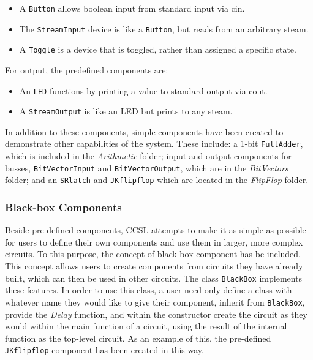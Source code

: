 \documentclass{article}
\newcommand{\Italics}[1]{\textit{#1}}
\newcommand{\ClassName}[1]{\texttt{#1}}
\newcommand{\FunctionName}[1]{\textit{#1}}
\begin{document}
\begin{itemize}

\item A \ClassName{Button} allows boolean input from standard input via cin.

\item The \ClassName{StreamInput} device is like a \ClassName{Button}, but reads from an arbitrary steam.

\item A \ClassName{Toggle} is a device that is toggled, rather than assigned a specific state.

\end{itemize}

For output, the predefined components are:

\begin{itemize}

\item An \ClassName{LED} functions by printing a value to standard output via cout.

\item A \ClassName{StreamOutput} is like an LED but prints to any steam.

\end{itemize}

In addition to these components, simple components have been created to demonstrate other capabilities of the system. These include: a 1-bit \ClassName{FullAdder}, which is included in the \Italics{Arithmetic} folder; input and output components for busses, \ClassName{BitVectorInput} and \ClassName{BitVectorOutput}, which are in the \Italics{BitVectors} folder; and an \ClassName{SRlatch} and \ClassName{JKflipflop} which are located in the \Italics{FlipFlop} folder.

\subsubsection{Black-box Components}

Beside pre-defined components, CCSL attempts to make it as simple as possible for users to define their own components and use them in larger, more complex circuits. To this purpose, the concept of black-box component has be included. This concept allows users to create components from circuits they have already built, which can then be used in other circuits. The class \ClassName{BlackBox} implements these features. In order to use this class, a user need only define a class with whatever name they would like to give their component, inherit from \ClassName{BlackBox}, provide the \FunctionName{Delay} function, and within the constructor create the circuit as they would within the main function of a circuit, using the result of the internal function as the top-level circuit. As an example of this, the pre-defined \ClassName{JKflipflop} component has been created in this way.
\end{document}
